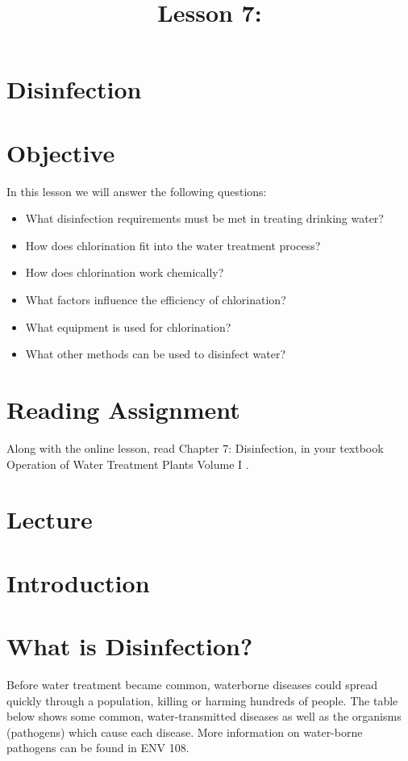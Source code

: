 \documentclass[10pt]{article}
\title{Lesson 7: }
\author{}
\date{}
\begin{document}
\maketitle
\section{Disinfection}
\section{Objective}
In this lesson we will answer the following questions:

\begin{itemize}
  \item What disinfection requirements must be met in treating drinking water?

  \item How does chlorination fit into the water treatment process?

  \item How does chlorination work chemically?

  \item What factors influence the efficiency of chlorination?

  \item What equipment is used for chlorination?

  \item What other methods can be used to disinfect water?

\end{itemize}
\section{Reading Assignment}
Along with the online lesson, read Chapter 7: Disinfection, in your textbook Operation of Water Treatment Plants Volume I .

\section{Lecture}
\section{Introduction}
\section{What is Disinfection?}
Before water treatment became common, waterborne diseases could spread quickly through a population, killing or harming hundreds of people. The table below shows some common, water-transmitted diseases as well as the organisms (pathogens) which cause each disease. More information on water-borne pathogens can be found in ENV 108.
\end{document}
